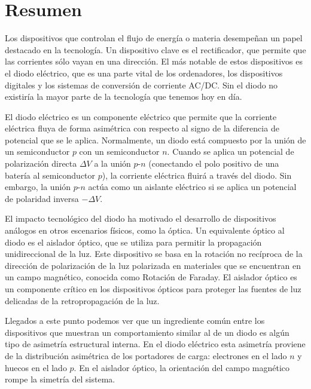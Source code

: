 \chapter{Resumen} %
\label{Resumen}

Los dispositivos que controlan el flujo de energía o materia desempeñan un papel destacado en la tecnología. Un dispositivo clave es el rectificador, que permite que las corrientes sólo vayan en una dirección. El más notable de estos dispositivos es el diodo eléctrico, que es una parte vital de los ordenadores, los dispositivos digitales y los sistemas de conversión de corriente AC/DC. Sin el diodo no existiría la mayor parte de la tecnología que tenemos hoy en día.

El diodo eléctrico es un componente eléctrico que permite que la corriente eléctrica fluya de forma asimétrica con respecto al signo de la diferencia de potencial que se le aplica. Normalmente, un diodo está compuesto por la unión de un semiconductor $p$ con un semiconductor $n$. Cuando se aplica un potencial de polarización directa $\Delta V$ a la unión $p$-$n$ (conectando el polo positivo de una batería al semiconductor $p$), la corriente eléctrica fluirá a través del diodo. Sin embargo, la unión $p$-$n$ actúa como un aislante eléctrico si se aplica un potencial de polaridad inversa $-\Delta V$.

El impacto tecnológico del diodo ha motivado el desarrollo de dispositivos análogos en otros escenarios físicos, como la óptica. Un equivalente óptico al diodo es el aislador óptico, que se utiliza para permitir la propagación unidireccional de la luz. Este dispositivo se basa en la rotación no recíproca de la dirección de polarización de la luz polarizada en materiales que se encuentran en un campo magnético, conocida como Rotación de Faraday. El aislador óptico es un componente crítico en los dispositivos ópticos para proteger las fuentes de luz delicadas de la retropropagación de la luz.

Llegados a este punto podemos ver que un ingrediente común entre los dispositivos que muestran un comportamiento similar al de un diodo es algún tipo de asimetría estructural interna. En el diodo eléctrico esta asimetría proviene de la distribución asimétrica de los portadores de carga: electrones en el lado $n$ y huecos en el lado $p$. En el aislador óptico, la orientación del campo magnético rompe la simetría del sistema.

